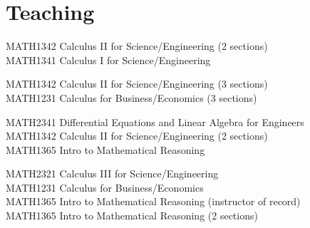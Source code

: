 \section*{Teaching}
MATH1342 Calculus II for Science/Engineering {\small\color{GriffinGreyHeader}(2 sections)}\\%
MATH1341 Calculus I for Science/Engineering
\smallskip

MATH1342 Calculus II for Science/Engineering {\small\color{GriffinGreyHeader}(3 sections)}\\%
MATH1231 Calculus for Business/Economics {\small\color{GriffinGreyHeader}(3 sections)}
\smallskip

MATH2341 Differential Equations and Linear Algebra for Engineers\\%
MATH1342 Calculus II for Science/Engineering {\small\color{GriffinGreyHeader}(2 sections)}\\%
MATH1365 Intro to Mathematical Reasoning
\smallskip

MATH2321 Calculus III for Science/Engineering\\%
MATH1231 Calculus for Business/Economics\\%
MATH1365 Intro to Mathematical Reasoning {\small\color{GriffinGreyHeader}(instructor of record)}\\%
MATH1365 Intro to Mathematical Reasoning {\small\color{GriffinGreyHeader}(2 sections)}
